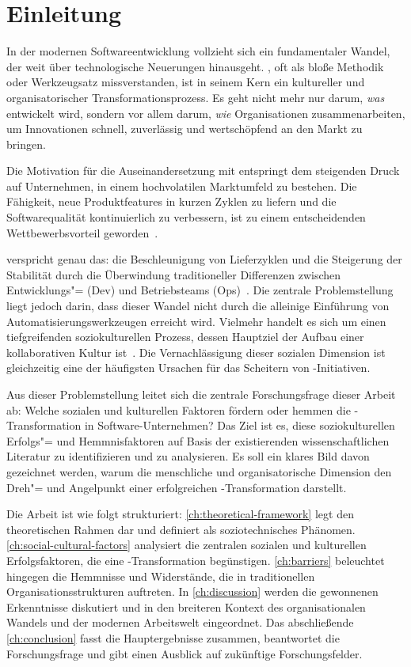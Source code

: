 \chapter{Einleitung}
In der modernen Softwareentwicklung vollzieht sich ein fundamentaler Wandel, der weit über technologische Neuerungen hinausgeht.
\DO, oft als bloße Methodik oder Werkzeugsatz missverstanden, ist in seinem Kern ein kultureller und organisatorischer Transformationsprozess.
Es geht nicht mehr nur darum, \emph{was} entwickelt wird, sondern vor allem darum, \emph{wie} Organisationen zusammenarbeiten, um Innovationen schnell, zuverlässig und wertschöpfend an den Markt zu bringen.

Die Motivation für die Auseinandersetzung mit \DO entspringt dem steigenden Druck auf Unternehmen, in einem hochvolatilen Marktumfeld zu bestehen.
Die Fähigkeit, neue Produktfeatures in kurzen Zyklen zu liefern und die Softwarequalität kontinuierlich zu verbessern, ist zu einem entscheidenden Wettbewerbsvorteil geworden~\cite[1]{mak25}.

\DO verspricht genau das: die Beschleunigung von Lieferzyklen und die Steigerung der Stabilität durch die Überwindung traditioneller Differenzen zwischen Entwicklungs"= (Dev) und Betriebsteams (Ops)~\cite[284]{kar24}.
Die zentrale Problemstellung liegt jedoch darin, dass dieser Wandel nicht durch die alleinige Einführung von Automatisierungswerkzeugen erreicht wird.
Vielmehr handelt es sich um einen tiefgreifenden soziokulturellen Prozess, dessen Hauptziel der Aufbau einer kollaborativen Kultur ist~\cite[4]{luz18}.
Die Vernachlässigung dieser sozialen Dimension ist gleichzeitig eine der häufigsten Ursachen für das Scheitern von \DO-Initiativen.

Aus dieser Problemstellung leitet sich die zentrale Forschungsfrage dieser Arbeit ab: Welche sozialen und kulturellen Faktoren fördern oder hemmen die \DO-Transformation in Software-Unternehmen?
Das Ziel ist es, diese soziokulturellen Erfolgs"= und Hemmnisfaktoren auf Basis der existierenden wissenschaftlichen Literatur zu identifizieren und zu analysieren.
Es soll ein klares Bild davon gezeichnet werden, warum die menschliche und organisatorische Dimension den Dreh"= und Angelpunkt einer erfolgreichen \DO-Transformation darstellt.

Die Arbeit ist wie folgt strukturiert: \autoref{ch:theoretical-framework} legt den theoretischen Rahmen dar und definiert \DO als soziotechnisches Phänomen.
\autoref{ch:social-cultural-factors} analysiert die zentralen sozialen und kulturellen Erfolgsfaktoren, die eine \DO-Transformation begünstigen.
\autoref{ch:barriers} beleuchtet hingegen die Hemmnisse und Widerstände, die in traditionellen Organisationsstrukturen auftreten.
In \autoref{ch:discussion} werden die gewonnenen Erkenntnisse diskutiert und in den breiteren Kontext des organisationalen Wandels und der modernen Arbeitswelt eingeordnet.
Das abschließende \autoref{ch:conclusion} fasst die Hauptergebnisse zusammen, beantwortet die Forschungsfrage und gibt einen Ausblick auf zukünftige Forschungsfelder.